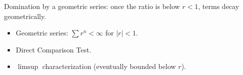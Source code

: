 \begin{remark*}
Domination by a geometric series: once the ratio is below $r < 1$, terms decay geometrically.
\end{remark*}

\begin{remark*}[Dependencies]
\begin{itemize}
  \item Geometric series: $\sum r^n < \infty$ for $|r| < 1$.
  \item Direct Comparison Test.
  \item $\limsup$ characterization (eventually bounded below $r$).
\end{itemize}
\end{remark*}
